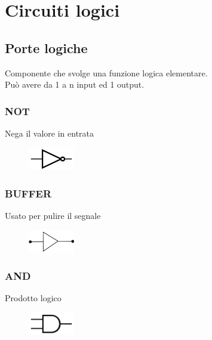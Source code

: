 \documentclass{report}
\begin{document}
\newpage
\section{Circuiti logici}
    \subsection{Porte logiche}
        Componente che svolge una funzione logica elementare. \\
        Può avere da 1 a n input ed 1 output. 
        \subsubsection{NOT}
        Nega il valore in entrata
        \begin{center}
            \begin{figure}[H]
                \includegraphics[width=2cm,height=1cm]{not.png}
            \end{figure}
        \end{center}
        \subsubsection{BUFFER}
            Usato per pulire il segnale
            \begin{center}
                \begin{figure}[H]
                    \includegraphics[width=2cm,height=1cm]{buffer.png}
                \end{figure}
            \end{center}
        \subsubsection{AND}
            Prodotto logico
            \begin{center}
                \begin{figure}[H]
                    \includegraphics[width=2cm,height=1cm]{and.png}
                \end{figure}
            \end{center}
\end{document}
